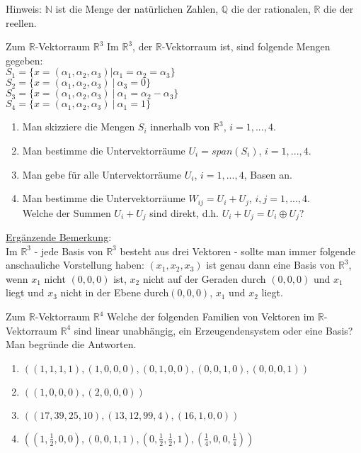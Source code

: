 \documentclass{uebblatt}
\begin{document}

Hinweis: $\mathbb{N}$ ist die Menge der natürlichen Zahlen, $\mathbb{Q}$ die der rationalen, $\mathbb{R}$ die der reellen.

\begin{aufgabe}{Zum $\mathbb{R}$-Vektorraum $\mathbb{R}^3$}
Im $\mathbb{R}^3$, der $\mathbb{R}$-Vektorraum ist, sind folgende Mengen gegeben:\\
$S_1 = \{x = (\alpha_1, \alpha_2, \alpha_3) | \alpha_1 = \alpha_2 = \alpha_3\}$\\
$S_2 = \{x = (\alpha_1, \alpha_2, \alpha_3) \> | \> \alpha_3 = 0\}$\\
$S_3 = \{x = (\alpha_1, \alpha_2, \alpha_3) \> | \> \alpha_1 = \alpha_2 - \alpha_3\}$\\
$S_4 = \{x = (\alpha_1, \alpha_2, \alpha_3) \> | \> \alpha_1 = 1\}$
\begin{enumerate}
\item Man skizziere die Mengen $S_i$ innerhalb von $\mathbb{R}^3$, $i = 1, ..., 4$.
\item Man bestimme die Untervektorräume $U­_i = span(S_i)$, $i = 1, ..., 4$.
\item Man gebe für alle Untervektorräume $U_i$, $i = 1, ..., 4$, Basen an.
\item Man bestimme die Untervektorräume $W_{ij} = U_i + U_j$, $i, j = 1, ..., 4$.\\
Welche der Summen $U_i + U_j$ sind direkt, d.h. $U_i + U_j = U_i \oplus U_j$?
\end{enumerate}
\underline{Ergänzende Bemerkung}:\\
Im $\mathbb{R}^3$ - jede Basis von $\mathbb{R}^3$ besteht aus drei Vektoren - sollte man immer folgende anschauliche Vorstellung haben: $(x­_1,x_2,x_3)$ ist genau dann eine Basis von $\mathbb{R}^3$, wenn $x_1$ nicht $(0,0,0)$ ist, $x_2$ nicht auf der Geraden durch $(0,0,0)$ und $x_1$ liegt und $x_3$ nicht in der Ebene durch\break$(0,0,0)$, $x_1$ und $x_2$ liegt. 
\end{aufgabe}


\begin{aufgabe}{Zum $\mathbb{R}$-Vektorraum $\mathbb{R}^4$}
Welche der folgenden Familien von Vektoren im $\mathbb{R}$-Vektorraum $\mathbb{R}^4$ sind linear unabhängig, ein Erzeugendensystem oder eine Basis? Man begründe die Antworten.
\begin{enumerate}
\item $((1, 1, 1, 1), (1, 0, 0, 0), (0, 1, 0, 0), (0, 0, 1, 0), (0, 0, 0, 1))$
\item $((1, 0, 0, 0), (2, 0, 0, 0))$
\item $((17, 39, 25, 10), (13, 12, 99, 4), (16, 1, 0, 0))$
\item $((1, \frac{1}{2}, 0, 0), (0, 0, 1, 1), (0, \frac{1}{2}, \frac{1}{2},1), (\frac{1}{4}, 0, 0, \frac{1}{4}))$
\end{enumerate}
\end{aufgabe}
\end{document}

